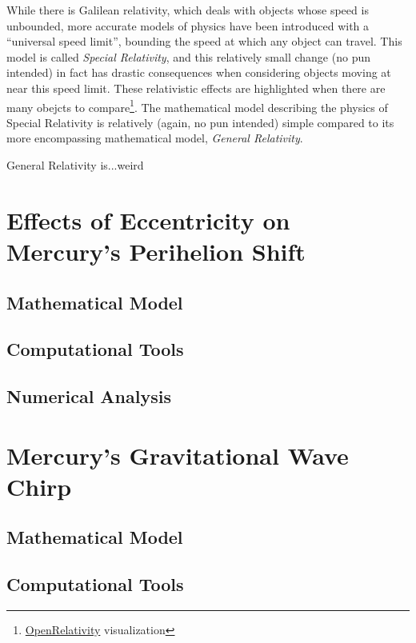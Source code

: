 \documentclass{report}
\begin{document}
    While there is Galilean relativity, which deals with objects whose speed is unbounded, more accurate models of physics have been introduced\cite{einstein1905electrodynamics} with a ``universal speed limit'', bounding the speed at which any object can travel.  This model is called \emph{Special Relativity}, and this relatively small change (no pun intended) in fact has drastic consequences when considering objects moving at near this speed limit.  These relativistic effects are highlighted when there are many obejcts to compare\footnote{\href{https://youtu.be/qol-zP9W5J4?si=7ty4vfO9ceFox48e}{OpenRelativity} visualization}\cite{openrelativity}. The mathematical model describing the physics of Special Relativity is relatively (again, no pun intended) simple compared to its more encompassing mathematical model, \emph{General Relativity}.

    General Relativity is...weird

\vfill
\pagebreak

    \section{Effects of Eccentricity on Mercury's Perihelion Shift}

        \subsection{Mathematical Model}

        \subsection{Computational Tools}

        \subsection{Numerical Analysis}

    \section{Mercury's Gravitational Wave Chirp}

        \subsection{Mathematical Model}

        \subsection{Computational Tools}
\end{document}
